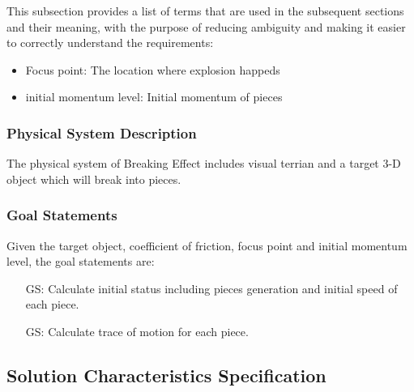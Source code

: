 \documentclass[12pt]{article}
\newcounter{goalnum} %
\newcommand{\progname}{Breaking Effect} %
\begin{document}
	This subsection provides a list of terms that are used in the subsequent
	sections and their meaning, with the purpose of reducing ambiguity and making it
	easier to correctly understand the requirements:
	
	\begin{itemize}
		
		\item Focus point: The location where explosion happeds 
		\item initial momentum level: Initial momentum of pieces  
		
	\end{itemize}
	
	\subsubsection{Physical System Description}
	
	The physical system of \progname{} includes visual terrian  and a target 3-D object which will break into pieces.
	
	
	\subsubsection{Goal Statements}
	
	\noindent Given the target object, coefficient of friction, focus point and initial momentum level, the goal statements are:
	
	\begin{itemize}
		
		\item[GS\refstepcounter{goalnum}\thegoalnum \label{G_speed}:] Calculate initial status including pieces generation and initial speed of each piece.​
		
		\item[GS\refstepcounter{goalnum}\thegoalnum \label{G_motion}:] Calculate trace of motion for each piece.
		
	\end{itemize}
	
	\subsection{Solution Characteristics Specification}
	
\end{document}
